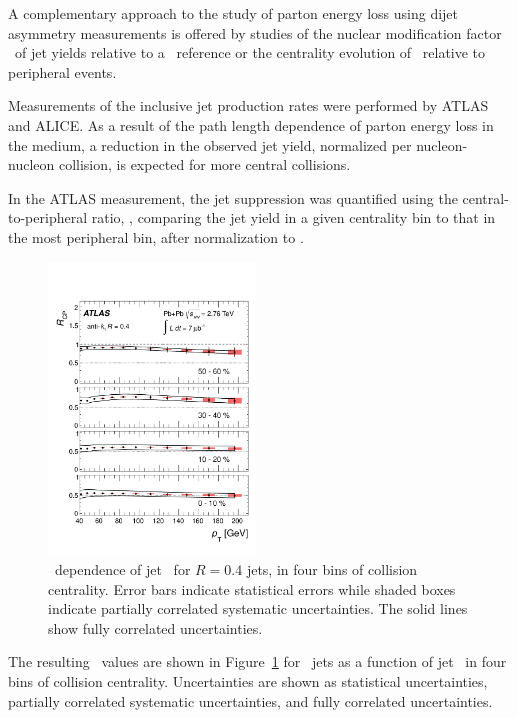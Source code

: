 A complementary approach to the study of parton energy loss using dijet asymmetry measurements
is offered by studies of the nuclear modification factor \Raa\ of jet yields relative 
to a \pp\ reference or the centrality evolution of \Rcp\ relative to peripheral events.

Measurements of the inclusive jet production rates were performed by ATLAS and ALICE.
As a result of the path length dependence of parton energy loss in the medium, 
\cite{Armesto:2011ht} a reduction in the observed jet yield, normalized per 
nucleon-nucleon collision, is expected for more central collisions.

In the ATLAS measurement, the jet suppression was quantified using the central-to-peripheral ratio, 
\Rcp, comparing the jet yield in a given centrality bin to that in the most peripheral bin, after 
normalization to \Ncoll.

\begin{figure}[!h]
\begin{center}
\includegraphics[width=0.49\textwidth]{jetfigures/ATLAS_jetRCP_04.pdf}
\caption{
\pT\ dependence of jet \Rcp\ for  $R=0.4$ jets,
in four bins of collision centrality. Error bars indicate
statistical errors while shaded boxes indicate
partially correlated systematic uncertainties. 
The solid lines show fully correlated uncertainties.
}
\label{fig:GR:rcprfour}
\end{center}
\end{figure}
The resulting \Rcp\ values are shown in Figure~\ref{fig:GR:rcprfour} 
for  \RFour\ jets as a function of jet \pT\ in four bins
of collision centrality.
Uncertainties are shown as statistical uncertainties, partially correlated systematic
uncertainties, and fully correlated uncertainties.

